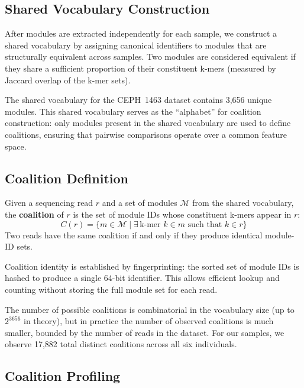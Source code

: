 \documentclass{../yalumba}
\begin{document}
\subsection{Shared Vocabulary Construction}
\label{sec:methods-vocabulary}

After modules are extracted independently for each sample, we construct a
shared vocabulary by assigning canonical identifiers to modules that are
structurally equivalent across samples.  Two modules are considered equivalent
if they share a sufficient proportion of their constituent k-mers (measured
by Jaccard overlap of the k-mer sets).

The shared vocabulary for the CEPH~1463 dataset contains 3{,}656 unique
modules.  This shared vocabulary serves as the ``alphabet'' for coalition
construction: only modules present in the shared vocabulary are used to
define coalitions, ensuring that pairwise comparisons operate over a common
feature space.

\subsection{Coalition Definition}
\label{sec:methods-coalition}

\begin{definition}
Given a sequencing read $r$ and a set of modules $\mathcal{M}$ from the
shared vocabulary, the \textbf{coalition} of $r$ is the set of module IDs
whose constituent k-mers appear in $r$:
\begin{equation}
  C(r) = \{m \in \mathcal{M} \mid \exists\, \text{k-mer } k \in m \text{ such that } k \in r\}
  \label{eq:coalition-def}
\end{equation}
Two reads have the same coalition if and only if they produce identical
module-ID sets.
\end{definition}

Coalition identity is established by fingerprinting: the sorted set of module
IDs is hashed to produce a single 64-bit identifier.  This allows efficient
lookup and counting without storing the full module set for each read.

The number of possible coalitions is combinatorial in the vocabulary size
(up to $2^{3656}$ in theory), but in practice the number of observed
coalitions is much smaller, bounded by the number of reads in the dataset.
For our samples, we observe 17{,}882 total distinct coalitions across all
six individuals.

\subsection{Coalition Profiling}
\label{sec:methods-profiling}
\end{document}
